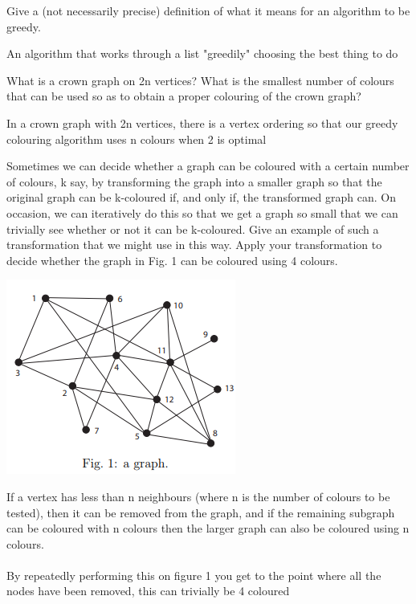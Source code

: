 \documentclass{exam}
\begin{document}
\begin{questions}
\question[2]Give a (not necessarily precise) definition of what it means for an algorithm to be greedy.
\begin{solution}[2in]
	An algorithm that works through a list "greedily" choosing the best thing to do
\end{solution}

\question[2]What is a crown graph on 2n vertices? What is the smallest number
of colours that can be used so as to obtain a proper colouring of the
crown graph?
\begin{solution}[2in]
	In a crown graph with 2n vertices, there is a vertex ordering so that our greedy colouring algorithm uses n colours when 2 is optimal
\end{solution}

\question[8]Sometimes we can decide whether a graph can be coloured with a certain
number of colours, k say, by transforming the graph into a smaller
graph so that the original graph can be k-coloured if, and only if, the
transformed graph can. On occasion, we can iteratively do this so that
we get a graph so small that we can trivially see whether or not it
can be k-coloured. Give an example of such a transformation that we
might use in this way. Apply your transformation to decide whether
the graph in Fig. 1 can be coloured using 4 colours. 
\begin{center}
	\includegraphics[scale=0.7]{graph}
\end{center}
\begin{solution}[2in]
If a vertex has less than n neighbours (where n is the number of colours to be tested), then it can be removed from the graph, and if the remaining subgraph can be coloured with n colours then the larger graph can also be coloured using n colours.\\
\\
By repeatedly performing this on figure 1 you get to the point where all the nodes have been removed, this can trivially be 4 coloured
\end{solution}


\end{questions}
\end{document}
